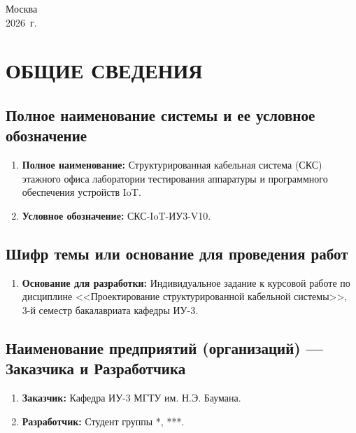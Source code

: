 \documentclass{bmstu}
\begin{document}
\begin{appendices}
\begin{titlepage}
    \begin{center}
        Москва\\
        2026~г.
    \end{center}
\end{titlepage}

\setcounter{page}{2}


\renewcommand{\thesection}{\arabic{section}}
\setcounter{section}{0}
\section{ОБЩИЕ СВЕДЕНИЯ}

\subsection{Полное наименование системы и ее условное обозначение}
\begin{enumerate}[label=\thesection.\arabic*]
    \item \textbf{Полное наименование:} Структурированная кабельная система (СКС) этажного офиса лаборатории тестирования аппаратуры и программного обеспечения устройств IoT.
    \item \textbf{Условное обозначение:} СКС-IoT-ИУ3-V10.
\end{enumerate}

\subsection{Шифр темы или основание для проведения работ}
\begin{enumerate}[label=\thesection.\arabic*]
    \item \textbf{Основание для разработки:} Индивидуальное задание к курсовой работе по дисциплине <<Проектирование структурированной кабельной системы>>, 3-й семестр бакалавриата кафедры ИУ-3.
\end{enumerate}

\subsection{Наименование предприятий (организаций) --- Заказчика и Разработчика}
\begin{enumerate}[label=\thesection.\arabic*]
    \item \textbf{Заказчик:} Кафедра ИУ-3 МГТУ им. Н.Э. Баумана.
    \item \textbf{Разработчик:} Студент группы *, ***.
\end{enumerate}


\end{appendices}
\end{document}
